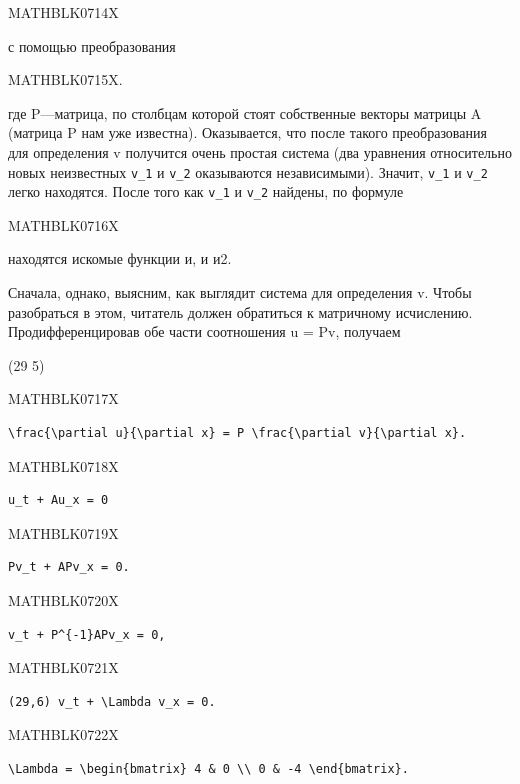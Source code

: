 \documentclass[
  ukrainian,
]{article}
\begin{document}
MATHBLK0714X

с помощью преобразования

MATHBLK0715X.

где P---матрица, по столбцам которой стоят собственные векторы матрицы A
(матрица P нам уже известна). Оказывается, что после такого
преобразования для определения v получится очень простая система (два
уравнения относительно новых неизвестных \texttt{v\_1} и \texttt{v\_2}
оказываются независимыми). Значит, \texttt{v\_1} и \texttt{v\_2} легко
находятся. После того как \texttt{v\_1} и \texttt{v\_2} найдены, по
формуле

MATHBLK0716X

находятся искомые функции и, и и2.

Сначала, однако, выясним, как выглядит система для определения v. Чтобы
разобраться в этом, читатель должен обратиться к матричному исчислению.
Продифференцировав обе части соотношения u = Pv, получаем

(29 5)

MATHBLK0717X

\begin{verbatim}
\frac{\partial u}{\partial x} = P \frac{\partial v}{\partial x}.
\end{verbatim}

MATHBLK0718X

\begin{verbatim}
u_t + Au_x = 0
\end{verbatim}

MATHBLK0719X

\begin{verbatim}
Pv_t + APv_x = 0.
\end{verbatim}

MATHBLK0720X

\begin{verbatim}
v_t + P^{-1}APv_x = 0,
\end{verbatim}

MATHBLK0721X

\begin{verbatim}
(29,6) v_t + \Lambda v_x = 0.
\end{verbatim}

MATHBLK0722X

\begin{verbatim}
\Lambda = \begin{bmatrix} 4 & 0 \\ 0 & -4 \end{bmatrix}.
\end{verbatim}
\end{document}
